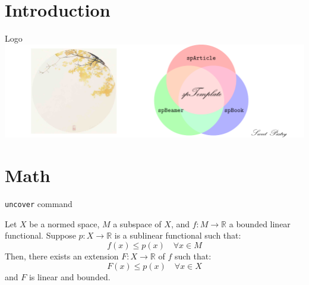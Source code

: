 \documentclass[
    ref = refDemo,
    style = 2
]{spBeamer}
\begin{document}
    \section{Introduction}
        \begin{frame}{Logo}
                \includegraphics[width=\textwidth]{cover.pdf}
        \end{frame}

    \section{Math}
        \begin{frame}{\texttt{uncover} command}
        \end{frame}

        \begin{frame}
            \begin{theorem}
                Let \( X \) be a normed space, \( M \) a subspace of \( X \), and \( f: M \to \mathbb{R} \) a bounded linear functional. Suppose \( p: X \to \mathbb{R} \) is a sublinear functional such that:
                \[
                f(x) \leq p(x) \quad \forall x \in M
                \]
                Then, there exists an extension \( F: X \to \mathbb{R} \) of \( f \) such that:
                \[
                F(x) \leq p(x) \quad \forall x \in X
                \]
                and \( F \) is linear and bounded.
            \end{theorem}
        \end{frame}
        
\end{document}
